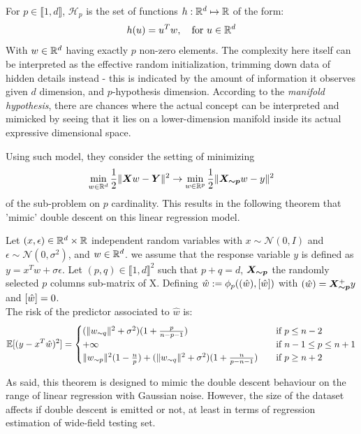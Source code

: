 \documentclass[twoside,10pt]{article}
\begin{document}
\begin{definition}
For $p \in \llbracket1,d\rrbracket$, $\mathcal{H}_p$ is the set of functions $h:\mathbb{R}^d\mapsto \mathbb{R}$ of the form:
$$
h(u)=u^Tw,\quad \text{for }u \in \mathbb{R}^d
$$
With $w \in \mathbb{R}^d$ having exactly $p$ non-zero elements. The complexity here itself can be interpreted as the effective random initialization, trimming down data of hidden details instead - this is indicated by the amount of information it observes given $d$ dimension, and $p$-hypothesis dimension. According to the \textit{manifold hypothesis}, there are chances where the actual concept can be interpreted and mimicked by seeing that it lies on a lower-dimension manifold inside its actual expressive dimensional space. 
\end{definition}
Using such model, they consider the setting of minimizing
\begin{equation}
\label{eq:linear_gaussian_erm}
\min_{w\in \mathbb{R}^d} \frac{1}{2}\lVert \bm{X} w - \bm{Y} \rVert^2 \to \min_{w\in \mathbb{R}^p} \frac{1}{2}\lVert \bm{X_{\sim p}} w - y \rVert^2
\end{equation}
of the sub-problem on $p$ cardinality. This results in the following theorem that 'mimic' double descent on this linear regression model. 
\begin{theorem}
\label{thm:double_descent_lr}
Let $(x, \epsilon)\in \mathbb{R}^d\times\mathbb{R}$ independent random variables with $x \sim \mathcal{N}(0,I)$  and $\epsilon \sim \mathcal{N}(0,\sigma^2)$, and $w \in \mathbb{R}^d$. we assume that the response variable $y$ is defined as $y=x^Tw +\sigma \epsilon$. Let $(p,q) \in \llbracket 1, d\rrbracket^2$ such that $p+q=d$, $\bm{X_{\sim p}}$ the randomly selected $p$ columns sub-matrix of X. Defining $\hat w:=\phi_p(({\hat w}),[{\hat w}])$ with $({\hat w})=\bm{X_{\sim p}}^+y$ and $[{\hat w}] = 0$.\\
The risk of the predictor associated to $\hat w$ is:
$$
\mathbb{E}[(y-x^T\hat w)^2] = 
\begin{cases}
(\lVert w_{\sim q} \rVert^2+\sigma^2)(1+\frac{p}{n-p-1}) &\quad\text{if } p\leq  n-2\\
+\infty &\quad\text{if }n-1 \leq p\leq  n+1\\
\lVert w_{\sim p} \rVert^2(1-\frac{n}{p}) +  (\lVert w_{\sim q} \rVert^2+\sigma^2)(1+\frac{n}{p-n-1}) &\quad\text{if }p\geq n+2\end{cases}
$$
\end{theorem}
As said, this theorem is designed to mimic the double descent behaviour on the range of linear regression with Gaussian noise. However, the size of the dataset affects if double descent is emitted or not, at least in terms of regression estimation of wide-field testing set. 
\end{document}
